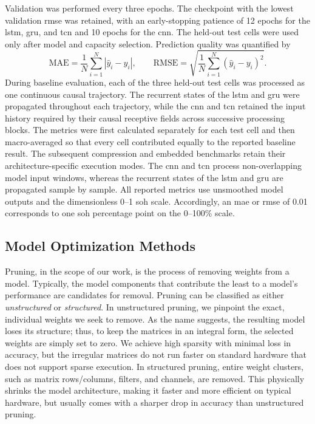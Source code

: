 \documentclass[final,3p,times]{elsarticle}
\begin{document}
Validation was performed every three epochs. The checkpoint with the lowest validation \ac{rmse} was retained, with an early-stopping patience of 12 epochs for the \ac{lstm}, \ac{gru}, and \ac{tcn} and 10 epochs for the \ac{cnn}. The held-out test cells were used only after model and capacity selection. Prediction quality was quantified by
\begin{equation}
    \mathrm{MAE}=\frac{1}{N}\sum_{i=1}^{N}\left|\hat{y}_i-y_i\right|,
    \qquad
    \mathrm{RMSE}=\sqrt{\frac{1}{N}\sum_{i=1}^{N}\left(\hat{y}_i-y_i\right)^2}.
\end{equation}
During baseline evaluation, each of the three held-out test cells was processed as one continuous causal trajectory. The recurrent states of the \ac{lstm} and \ac{gru} were propagated throughout each trajectory, while the \ac{cnn} and \ac{tcn} retained the input history required by their causal receptive fields across successive processing blocks. The metrics were first calculated separately for each test cell and then macro-averaged so that every cell contributed equally to the reported baseline result. The subsequent compression and embedded benchmarks retain their architecture-specific execution modes. The \ac{cnn} and \ac{tcn} process non-overlapping model input windows, whereas the recurrent states of the \ac{lstm} and \ac{gru} are propagated sample by sample. All reported metrics use unsmoothed model outputs and the dimensionless 0--1 \ac{soh} scale. Accordingly, an \ac{mae} or \ac{rmse} of 0.01 corresponds to one \ac{soh} percentage point on the 0--100\% scale.

\subsection{Model Optimization Methods} \label{sub:model_optimization}


Pruning, in the scope of our work, is the process of removing weights from a model. Typically, the model components that contribute the least to a model's performance are candidates for removal. Pruning can be classified as either \textit{unstructured} or \textit{structured}. In unstructured pruning, we pinpoint the exact, individual weights we seek to remove. As the name suggests, the resulting model loses its structure; thus, to keep the matrices in an integral form, the selected weights are simply set to zero. We achieve high sparsity with minimal loss in accuracy, but the irregular matrices do not run faster on standard hardware that does not support sparse execution. In structured pruning, entire weight clusters, such as matrix rows/columns, filters, and channels, are removed. This physically shrinks the model architecture, making it faster and more efficient on typical hardware, but usually comes with a sharper drop in accuracy than unstructured pruning.
\end{document}
